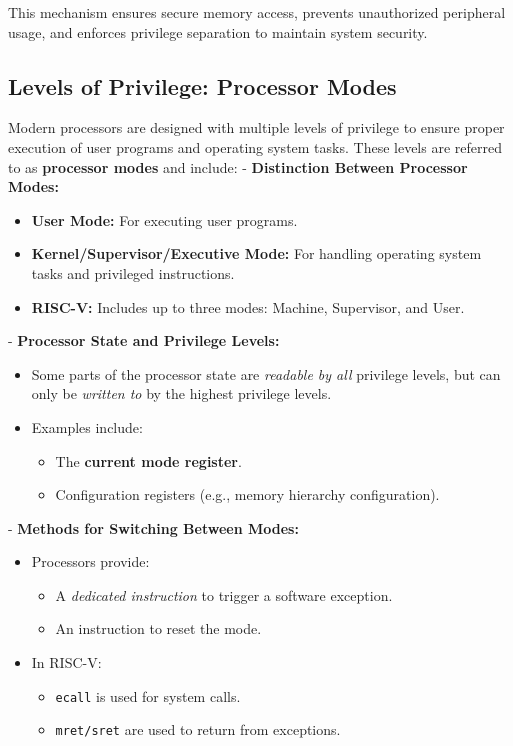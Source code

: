 \noindent This mechanism ensures secure memory access, prevents unauthorized peripheral usage, and enforces privilege separation to maintain system security.

\subsection{Levels of Privilege: Processor Modes}
Modern processors are designed with multiple levels of privilege to ensure proper execution of user programs and operating system tasks. These levels are referred to as \textbf{processor modes} and include:
\vspace{5px}
- \textbf{Distinction Between Processor Modes:} \\
\begin{itemize}
    \item \textbf{User Mode:} For executing user programs.
    \item \textbf{Kernel/Supervisor/Executive Mode:} For handling operating system tasks and privileged instructions.
    \item \textbf{RISC-V:} Includes up to three modes: Machine, Supervisor, and User.
\end{itemize}
\vspace{5px}
- \textbf{Processor State and Privilege Levels:} \\ 
\begin{itemize}
    \item Some parts of the processor state are \textit{readable by all} privilege levels, but can only be \textit{written to} by the highest privilege levels.
    \item Examples include:
    \begin{itemize}
        \item The \textbf{current mode register}.
        \item Configuration registers (e.g., memory hierarchy configuration).
    \end{itemize}
\end{itemize}
\vspace{5px}
- \textbf{Methods for Switching Between Modes:} \\ 
\begin{itemize}
    \item Processors provide:
    \begin{itemize}
        \item A \textit{dedicated instruction} to trigger a software exception.
        \item An instruction to reset the mode.
    \end{itemize}
    \item In RISC-V:
    \begin{itemize}
        \item \texttt{ecall} is used for system calls.
        \item \texttt{mret/sret} are used to return from exceptions.
    \end{itemize}
\end{itemize}


